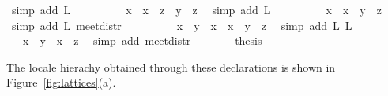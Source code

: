 \begin{isabellebody}
\ {\isacharparenleft}simp\ add{\isacharcolon}\ L{}{\isacharparenright}\isanewline
\ \ \ \ \isamarkupfalse%
\ \isamarkupfalse%
\ {\isachardoublequoteopen}{\isachardot}{\isachardot}{\isachardot}\ {\isacharequal}\ x\ {\isasymsqunion}\ {\isacharparenleft}{\isacharparenleft}x\ {\isasymsqinter}\ z{\isacharparenright}\ {\isasymsqunion}\ {\isacharparenleft}y\ {\isasymsqinter}\ z{\isacharparenright}{\isacharparenright}{\isachardoublequoteclose}\ \isamarkupfalse%
\ {\isacharparenleft}simp\ add{\isacharcolon}\ L{}{\isacharparenright}\isanewline
\ \ \ \ \isamarkupfalse%
\ \isamarkupfalse%
\ {\isachardoublequoteopen}{\isachardot}{\isachardot}{\isachardot}\ {\isacharequal}\ x\ {\isasymsqunion}\ {\isacharparenleft}{\isacharparenleft}x\ {\isasymsqunion}\ y{\isacharparenright}\ {\isasymsqinter}\ z{\isacharparenright}{\isachardoublequoteclose}\ \isamarkupfalse%
\ {\isacharparenleft}simp\ add{\isacharcolon}\ L{}\ meet{\isacharunderscore}distr{\isacharparenright}\isanewline
\ \ \ \ \isamarkupfalse%
\ \isamarkupfalse%
\ {\isachardoublequoteopen}{\isachardot}{\isachardot}{\isachardot}\ {\isacharequal}\ {\isacharparenleft}{\isacharparenleft}x\ {\isasymsqunion}\ y{\isacharparenright}\ {\isasymsqinter}\ x{\isacharparenright}\ {\isasymsqunion}\ {\isacharparenleft}{\isacharparenleft}x\ {\isasymsqunion}\ y{\isacharparenright}\ {\isasymsqinter}\ z{\isacharparenright}{\isachardoublequoteclose}\ \isamarkupfalse%
\ {\isacharparenleft}simp\ add{\isacharcolon}\ L{}\ L{}{\isacharparenright}\isanewline
\ \ \ \ \isamarkupfalse%
\ \isamarkupfalse%
\ {\isachardoublequoteopen}{\isachardot}{\isachardot}{\isachardot}\ {\isacharequal}\ {\isacharparenleft}x\ {\isasymsqunion}\ y{\isacharparenright}\ {\isasymsqinter}\ {\isacharparenleft}x\ {\isasymsqunion}\ z{\isacharparenright}{\isachardoublequoteclose}\ \isamarkupfalse%
\ {\isacharparenleft}simp\ add{\isacharcolon}\ meet{\isacharunderscore}distr{\isacharparenright}\isanewline
\ \ \ \ \isamarkupfalse%
\ \isamarkupfalse%
\ {\isacharquery}thesis\ \isacommand{{\isachardot}}\isamarkupfalse%
\isanewline
\ \ \isamarkupfalse%
%
\endisatagproof
{\isafoldproof}%
%
\isadelimproof
%
\endisadelimproof
%
\begin{isamarkuptext}%
The locale hierachy obtained through these declarations is shown in Figure~\ref{fig:lattices}(a).


\end{isamarkuptext}
\end{isabellebody}
